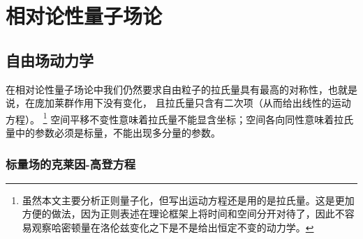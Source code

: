 \documentclass[hyperref, UTF8, a4paper]{ctexart}
\begin{document}
\section{相对论性量子场论}

\subsection{自由场动力学}\label{sec:qft-free-dynamics}

在相对论性量子场论中我们仍然要求自由粒子的拉氏量具有最高的对称性，也就是说，在庞加莱群作用下没有变化，
且拉氏量只含有二次项（从而给出线性的运动方程）。%
\footnote{虽然本文主要分析正则量子化，但写出运动方程还是用的是拉氏量。这是更加方便的做法，因为正则表述在理论框架上将时间和空间分开对待了，因此不容易观察哈密顿量在洛伦兹变化之下是不是给出恒定不变的动力学。}
空间平移不变性意味着拉氏量不能显含坐标；空间各向同性意味着拉氏量中的参数必须是标量，不能出现多分量的参数。

\subsubsection{标量场的克莱因-高登方程}\label{sec:k-g-eq}
\end{document}

